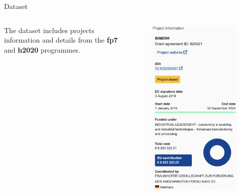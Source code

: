 \begin{tframe}{Dataset}
\begin{columns}
\begin{column}{0.53\textwidth}
        The dataset includes projects information and details from the \textbf{\acrshort{fp7}} \cite{CORDIS_FP7_2015} and \textbf{\acrshort{h2020}} \cite{CORDIS_H2020_2015} programmes.
    \end{column}
    \begin{column}{0.4\textwidth}
        \vspace{-.5cm}
        \begin{figure}[htbp]
            \centering
            \includegraphics[width=.8\textwidth]{../img/scenario-analysis/example-project.png}
        \end{figure}
    \end{column}
\end{columns}
\end{tframe}